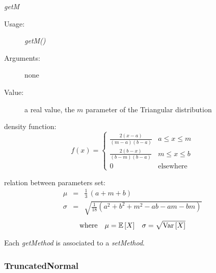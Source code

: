 \begin{description}
\begin{description}
\item \textit{getM}
\begin{description}
\item[Usage:] \textit{getM()}
\item[Arguments:] none
\item[Value:]  a real value,  the $m$ parameter of the Triangular distribution
\end{description}
\bigskip
\end{description}

\item[Details:]  \rule{0pt}{1em}
\begin{description}
\item density function:
\begin{equation}
f(x) =
\left\{
\begin{array}{ll}
\displaystyle \frac{2(x-a)}{(m-a)(b-a)} & a \leq x \leq m \\
\displaystyle \frac{2(b-x)}{(b-m)(b-a)} & m \leq x \leq b \\
0 & \mbox{elsewhere}
\end{array}
\right.
\end{equation}

\item relation between parameters set:
\begin{eqnarray*}
\mu                                       &       =       &   \frac{1}{3}\,(a+m+b)        \\
\sigma                            &  =    &       \sqrt{ \frac{1}{18} (a^2+b^2+m^2-ab-am-bm)}
\end{eqnarray*}
\begin{align*}
\mbox{where}
&&
\mu = {\mathbb E}\left[ X \right]
&&
\sigma = \sqrt{{\rm Var}\left[ X \right] }
\end{align*}
\end{description}
\bigskip

\item[Links:]  \rule{0pt}{1em}
\end{description}


Each  \textit{getMethod}  is associated to a \textit{setMethod}.

\newpage
\subsubsection{TruncatedNormal}

